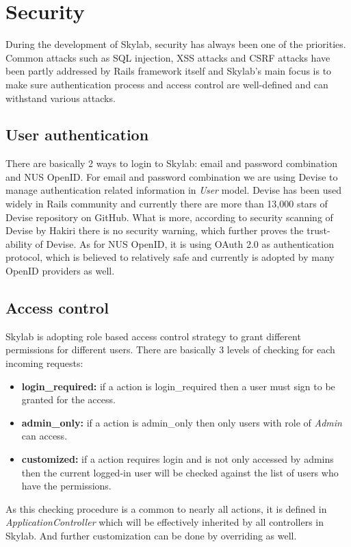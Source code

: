 \chapter{Security} \label{security}

During the development of Skylab, security has always been one of the priorities. Common attacks such as SQL injection, XSS attacks and CSRF attacks have been partly addressed by Rails framework itself and Skylab's main focus is to make sure authentication process and access control are well-defined and can withstand various attacks.

\section{User authentication}

There are basically 2 ways to login to Skylab: email and password combination and NUS OpenID. For email and password combination we are using Devise to manage authentication related information in \textit{User} model. Devise has been used widely in Rails community and currently there are more than 13,000 stars of Devise repository on GitHub\cite{citation13}. What is more, according to security scanning of Devise by Hakiri there is no security warning, which further proves the trust-ability of Devise\cite{citation13}. As for NUS OpenID, it is using OAuth 2.0 as authentication protocol, which is believed to relatively safe and currently is adopted by many OpenID providers as well\cite{citation14}.

\section{Access control}

Skylab is adopting role based access control strategy to grant different permissions for different users. There are basically 3 levels of checking for each incoming requests:

\begin{itemize}
  \item \textbf{login\_required:} if a action is login\_required then a user must sign to be granted for the access.
  \item \textbf{admin\_only:} if a action is admin\_only then only users with role of \textit{Admin} can access.
  \item \textbf{customized:} if a action requires login and is not only accessed by admins then the current logged-in user will be checked against the list of users who have the permissions.
\end{itemize}

As this checking procedure is a common to nearly all actions, it is defined in \textit{ApplicationController} which will be effectively inherited by all controllers in Skylab. And further customization can be done by overriding as well.
